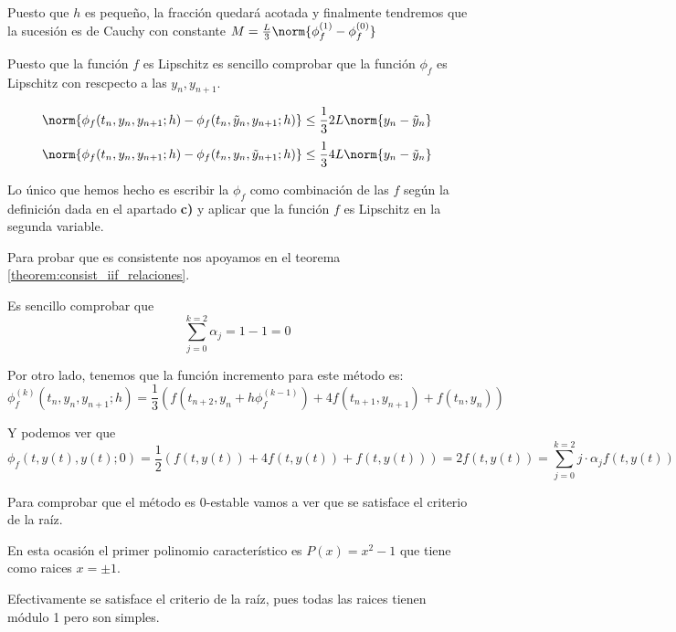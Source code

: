 \begin{problem}[4]
Puesto que $h$ es pequeño, la fracción quedará acotada y finalmente tendremos que la sucesión es de Cauchy con constante $M=\frac{L}{3}\norm{\phi_f^{(1)}-\phi_f^{(0)}}$

\spart
{}

Puesto que la función $f$ es Lipschitz es sencillo comprobar que la función $\phi_f$ es Lipschitz con rescpecto a las $y_n,y_{n+1}$. 

\[\norm{\phi_f(t_n,y_n,y_{n+1};h)-\phi_f(t_n,\tilde{y}_n,y_{n+1};h)} \leq\frac{1}{3} 2L\norm{y_n-\tilde{y}_n}\]
\[\norm{\phi_f(t_n,y_n,y_{n+1};h)-\phi_f(t_n,y_n,\tilde{y}_{n+1};h)} \leq\frac{1}{3} 4L\norm{y_n-\tilde{y}_n}\]

Lo único que hemos hecho es escribir la $\phi_f$ como combinación de las $f$ según la definición dada en el apartado \textbf{c)} y aplicar que la función $f$ es Lipschitz en la segunda variable.

\spart


Para probar que es consistente nos apoyamos en el teorema \ref{theorem:consist_iif_relaciones}. 

Es sencillo comprobar que 
\[\sum_{j=0}^{k=2}α_j = 1-1 = 0\]

Por otro lado, tenemos que la función incremento para este método es:
\[\phi_f^{(k)}(t_n,y_n,y_{n+1};h) = \frac{1}{3}\left(f(t_{n+2},y_n+h\phi^{(k-1)}_f)+4f(t_{n+1},y_{n+1})+f(t_n,y_n) \right)\]

Y podemos ver que
\[\phi_f(t,y(t),y(t);0) = \frac{1}{2} \left(f(t,y(t))+4f(t,y(t))+f(t,y(t)) \right) = 2f(t,y(t)) = \sum_{j=0}^{k=2}j\cdot α_j f(t,y(t))\]

\spart

Para comprobar que el método es 0-estable vamos a ver que se satisface el criterio de la raíz.

En esta ocasión el primer polinomio característico es $P(x) = x^2-1$ que tiene como raices $x=\pm 1$.

Efectivamente se satisface el criterio de la raíz, pues todas las raices tienen módulo 1 pero son simples.


\end{problem}

